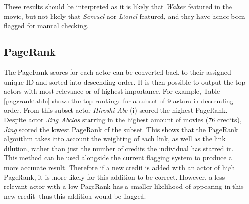 \documentclass[12pt]{ieeeconf}      %
\begin{document}
\noindent These results should be interpreted as it is likely that \textit{Walter} featured in the movie, but not likely that \textit{Samuel} nor \textit{Lionel} featured, and they have hence been flagged for manual checking.


\subsection{PageRank}
\indent The PageRank scores for each actor can be converted back to their assigned unique ID and sorted into descending order.  It is then possible to output the top actors with most relevance or of highest importance. For example,  Table \ref{pageranktable} shows the top rankings for a subset of 9 actors in descending order.  From this subset actor \textit{Hiroshi Abe} (i) scored the highest PageRank.  Despite actor \textit{Jing Abalos} starring in the highest amount of movies (76 credits), \textit{Jing} scored the lowest PageRank of the subset. This shows that the PageRank algorithm takes into account the weighting of each link, as well as the link dilution, rather than just the number of credits the individual has starred in.
\\
\indent This method can be used alongside the current flagging system to produce a more accurate result.  Therefore if a new credit is added with an actor of high PageRank, it is more likely for this addition to be correct.  However, a less relevant actor with a low PageRank has a smaller likelihood of appearing in this new credit, thus this addition would be flagged.
\end{document}
